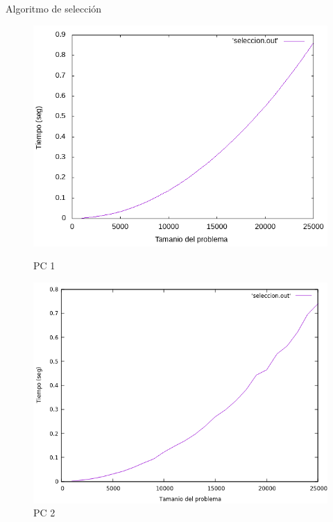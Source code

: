 \documentclass{beamer}
\begin{document}
\begin{frame}[fragile]{Algoritmo de selección}
\begin{figure}[H]
\centering
\begin{minipage}{.5\textwidth}
  \centering
  \includegraphics[width=\linewidth]{empirica_seleccion.png}
   \caption*{PC 1}
\end{minipage}%
\begin{minipage}{.5\textwidth}
  \centering
  \includegraphics[width=\linewidth]{empirica_seleccion_2.png}
  \caption*{PC 2}
\end{minipage}
\end{figure}
\end{frame}
\end{document}
